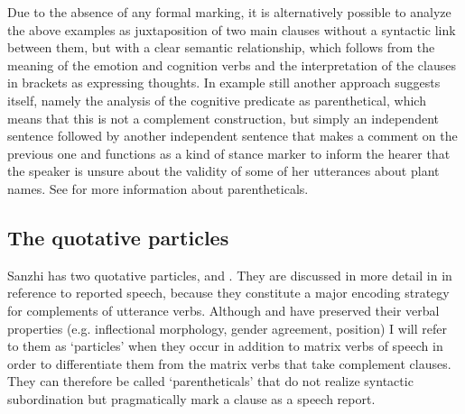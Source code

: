 Due to the absence of any formal marking, it is alternatively possible to analyze the above examples as juxtaposition of two main clauses without a syntactic link between them, but with a clear semantic relationship, which follows from the meaning of the emotion and cognition verbs and the interpretation of the clauses in brackets as expressing thoughts. In example  still another approach suggests itself, namely the analysis of the cognitive predicate as parenthetical, which means that this is not a complement construction, but simply an independent sentence followed by another independent sentence that makes a comment on the previous one and functions as a kind of stance marker to inform the hearer that the speaker is unsure about the validity of some of her utterances about plant names. See  for more information about parentheticals.




\subsection{The quotative particles}
\label{ssec:The quotative particles}

Sanzhi has two quotative particles,  and . They are discussed in more detail in  in reference to reported speech, because they constitute a major encoding strategy for complements of utterance verbs. Although  and  have preserved their verbal properties (e.g. inflectional morphology, gender agreement, position) I will refer to them as `particles' when they occur in addition to matrix verbs of speech in order to differentiate them from the matrix verbs that take complement clauses. They can therefore be called `parentheticals' that do not realize syntactic subordination but pragmatically mark a clause as a speech report.

